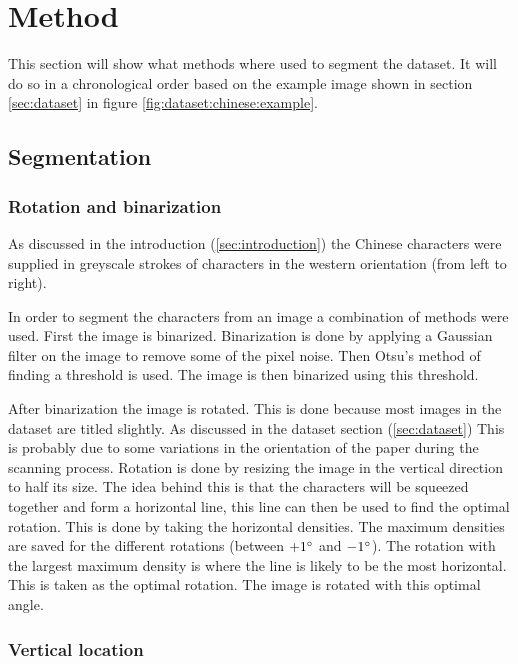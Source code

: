 \section{Method} %
\label{sec:method}

This section will show what methods where used to segment the dataset. It will do so in a chronological order based on the example image shown in section \ref{sec:dataset} in figure \ref{fig:dataset:chinese:example}.

\subsection{Segmentation}

\subsubsection{Rotation and binarization}


As discussed in the introduction (\ref{sec:introduction}) the Chinese characters were supplied in greyscale strokes of characters in the western orientation (from left to right).

In order to segment the characters from an image a combination of methods were used. First the image is binarized. Binarization is done by applying a Gaussian filter on the image to remove some of the pixel noise. Then Otsu's \cite{otsu}  method of finding a threshold is used. The image is then binarized using this threshold.

After binarization the image is rotated. This is done because most images in the dataset are titled slightly. As discussed in the dataset section (\ref{sec:dataset}) This is probably due to some variations in the orientation of the paper during the scanning process. Rotation is done by resizing the image in the vertical direction to half its size. The idea behind this is that the characters will be squeezed together and form a horizontal line, this line can then be used to find the optimal rotation. This is done by taking the horizontal densities. The maximum densities are saved for the different rotations (between $+1\degree$ and $-1\degree$). The rotation with the largest maximum density is where the line is likely to be the most horizontal. This is taken as the optimal rotation. The image is rotated with this optimal angle.

\subsubsection{Vertical location}

